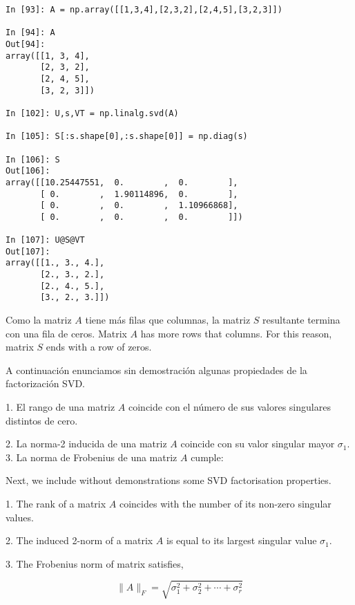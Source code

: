 \begin{center}
    \begin{minipage}{0.7\textwidth}
    \begin{verbatim}
In [93]: A = np.array([[1,3,4],[2,3,2],[2,4,5],[3,2,3]])

In [94]: A
Out[94]: 
array([[1, 3, 4],
       [2, 3, 2],
       [2, 4, 5],
       [3, 2, 3]])

In [102]: U,s,VT = np.linalg.svd(A)

In [105]: S[:s.shape[0],:s.shape[0]] = np.diag(s)

In [106]: S
Out[106]: 
array([[10.25447551,  0.        ,  0.        ],
       [ 0.        ,  1.90114896,  0.        ],
       [ 0.        ,  0.        ,  1.10966868],
       [ 0.        ,  0.        ,  0.        ]])

In [107]: U@S@VT
Out[107]: 
array([[1., 3., 4.],
       [2., 3., 2.],
       [2., 4., 5.],
       [3., 2., 3.]])
\end{verbatim}
\end{minipage}
\end{center}

\begin{paracol}{2}
Como la matriz $A$ tiene más filas que columnas, la matriz $S$ resultante termina con una fila de ceros.
\switchcolumn
Matrix $A$ has more rows that columns. For this reason, matrix $S$ ends with a row of zeros. 
\end{paracol}

\begin{paracol}{2}
A continuación enunciamos sin demostración algunas propiedades de la factorización SVD.

1. El rango de una matriz $A$ coincide con el número de sus valores singulares distintos de cero.

2. La norma-2 inducida de una matriz $A$ coincide con su valor singular mayor $\sigma_1$.
3. La norma de Frobenius de una matriz $A$ cumple:

\switchcolumn
Next, we include without demonstrations some SVD factorisation properties.

1. The rank of a matrix $A$ coincides with the number of its non-zero singular values.

2. The induced 2-norm of a matrix $A$ is equal to its largest singular value $\sigma_1$.

3. The Frobenius norm of matrix satisfies,
\end{paracol}

\begin{equation*}
\lVert A \rVert_{F}=\sqrt{\sigma_1^2+\sigma_2^2+\cdots +\sigma_r^2}
\end{equation*}


